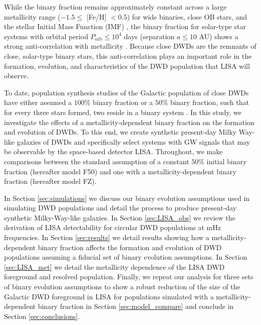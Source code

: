 \documentclass[twocolumn, linenumbers]{aastex631}
\begin{document}
While the binary fraction remains approximately constant across a large metallicity range ($-1.5 \leq$ [Fe/H] $< 0.5$) for wide binaries, close OB stars, and the stellar Initial Mass Function (IMF) \citep{Moe2017, Moe2019}, the binary fraction for solar-type star systems with orbital period $P_{\text{orb}}\leq 10^4$ days (separation $a \leq 10$ AU) shows a strong anti-correlation with metallicity \citep[e.g.][]{Badenes2018, Moe2019, Mazzola2020, Price-Whelan2020}. Because close DWDs are the remnants of close, solar-type binary stars, this anti-correlation plays an important role in the formation, evolution, and characteristics of the DWD population that LISA will observe.


To date, population synthesis studies of the Galactic population of close DWDs have either assumed a $100\%$ binary fraction or a $50\%$ binary fraction, such that for every three stars formed, two reside in a binary system \citep{Nelemans2001a, Yu2013, Korol2017, Lamberts2019}. In this study, we investigate the effects of a metallicity-dependent binary fraction on the formation and evolution of DWDs. To this end, we create synthetic present-day Milky Way-like galaxies of DWDs and specifically select systems with GW signals that may be observable by the space-based detector LISA. Throughout, we make comparisons between the standard assumption of a constant $50\%$ initial binary fraction (hereafter model F50) and one with a metallicity-dependent binary fraction (hereafter model FZ).  

In Section \ref{sec:simulations} we discuss our binary evolution assumptions used in simulating DWD populations and detail the process to produce present-day synthetic Milky-Way-like galaxies. In Section \ref{sec:LISA_obs} we review the derivation of LISA detectability for circular DWD populations at mHz frequencies. In Section \ref{sec:results} we detail results showing how a metallicity-dependent binary fraction affects the formation and evolution of DWD populations assuming a fiducial set of binary evolution assumptions. In Section \ref{sec:LISA_met} we detail the metallicity dependence of the LISA DWD foreground and resolved population. Finally, we repeat our analysis for three sets of binary evolution assumptions to show a robust reduction of the size of the Galactic DWD foreground in LISA for populations simulated with a metallicity-dependent binary fraction in Section \ref{sec:model_compare} and conclude in Section \ref{sec:conclusions}.  
\end{document}
